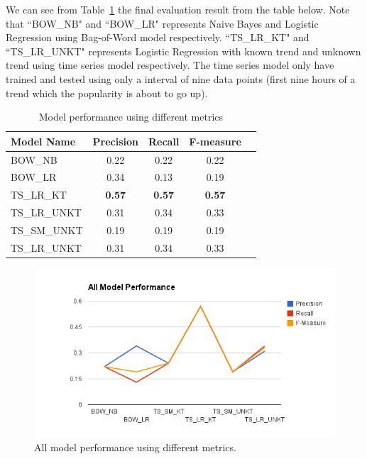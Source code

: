 \documentclass{article}
\begin{document}
We can see from Table~\ref{tab-result} the final evaluation result from the table below. Note that ``BOW\_NB" and ``BOW\_LR" represents Naive Bayes and Logistic Regression using Bag-of-Word model respectively. ``TS\_LR\_KT" and ``TS\_LR\_UNKT" represents Logistic Regression with known trend and unknown trend using time series model respectively. The time series model only have trained and tested using only a interval of nine data points (first nine hours of a trend which the popularity is about to go up).  

\begin{table}[t]
\caption{Model performance using different metrics}
\label{tab-result}
\vskip 0.15in
\begin{center}
\begin{small}
\begin{sc}
\begin{tabular}{lcccr}
\hline
\abovespace\belowspace
Model Name & Precision & Recall & F-measure \\
\hline
\abovespace
BOW\_NB   & 0.22 & 0.22 & 0.22 \\		
BOW\_LR & 0.34 & 0.13 & 0.19 \\		
TS\_LR\_KT    & \textbf{0.57} & \textbf{0.57} & \textbf{0.57} \\	
TS\_LR\_UNKT   & 0.31 & 0.34 & 0.33     \\
TS\_SM\_UNKT	& 0.19	& 0.19	& 0.19	\\
\belowspace
TS\_LR\_UNKT	& 0.31	& 0.34	& 0.33	\\
\hline
\end{tabular}
\end{sc}
\end{small}
\end{center}
\vskip -0.1in
\end{table}

\begin{figure}[ht]
\vskip 0.2in
\begin{center}
\centerline{\includegraphics[width=\columnwidth]{allPerformance}}
\caption{All model performance using different metrics.}
\label{all-performance}
\end{center}
\vskip -0.2in
\end{figure} 
\end{document}
